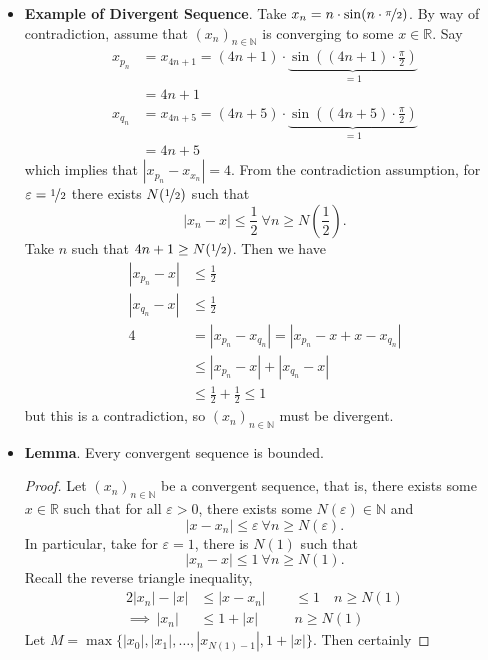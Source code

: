 \documentclass{article}
\newcommand{\R}{\mathbb{R}}
\newcommand{\N}{\mathbb{N}}
\newcommand{\seq}[2]{(#1_{#2})_{#2 \in \N}}
\newcommand{\?}{\stackrel{?}{=}}
\begin{document}
\begin{itemize}
\begin{proof}
    \end{proof}
    \item \textbf{Example of Divergent Sequence}. Take $x_n = n \cdot \sin(n \cdot \nicefrac{\pi}{2})$. By way of contradiction, assume that $\seq{x}{n}$ is converging to some $x \in \R$. Say
    \begin{align*}
        x_{p_n} &= x_{4n + 1} = (4n + 1) \cdot \underbrace{\sin((4n + 1) \cdot \frac{\pi}{2})}_{= 1} \\
        &= 4n + 1 \\
        x_{q_n} &= x_{4n + 5} = (4n + 5) \cdot \underbrace{\sin((4n + 5) \cdot \frac{\pi}{2})}_{= 1} \\
        &= 4n + 5
    \end{align*}
    which implies that $|x_{p_n} - x_{x_n}| = 4$. From the contradiction assumption, for $\varepsilon = \nicefrac{1}{2}$ there exists $N(\nicefrac{1}{2})$ such that
    $$|x_n - x| \leq \frac{1}{2} \ \forall n \geq N(\frac{1}{2}).$$
    Take $n$ such that $4n + 1 \geq N(\nicefrac{1}{2})$. Then we have
    \begin{align*}
        |x_{p_n} - x| &\leq \frac{1}{2} \\
        |x_{q_n} - x| &\leq \frac{1}{2} \\
        4 &= |x_{p_n} - x_{q_n}| = |x_{p_n} - x + x - x_{q_n}| \\
        &\leq |x_{p_n} - x| + |x_{q_n} - x| \\
        &\leq \frac{1}{2} + \frac{1}{2} \leq 1
    \end{align*}
    but this is a contradiction, so $\seq{x}{n}$ must be divergent.
    \item \textbf{Lemma}. Every convergent sequence is bounded.
    \begin{proof}
        Let $\seq{x}{n}$ be a convergent sequence, that is, there exists some $x \in \R$ such that for all $\varepsilon > 0$, there exists some $N(\varepsilon) \in \N$ and
        $$|x - x_n| \leq \varepsilon \ \forall n \geq N(\varepsilon).$$
        In particular, take for $\varepsilon = 1$, there is $N(1)$ such that
        $$|x_n - x| \leq 1 \ \forall n \geq N(1).$$
        Recall the reverse triangle inequality,
        \begin{alignat*}{2}
        |x_n| - |x| &\leq |x - x_n| &&\leq 1 \quad n \geq N(1) \\
        \implies \, |x_n| &\leq 1 + |x| \quad &&n \geq N(1)
        \end{alignat*}
        Let $M = \max\{|x_0|, |x_1|, \ldots, |x_{N(1) - 1}|, 1 + |x|\}$. Then certainly

\end{proof}
\end{itemize}
\end{document}
